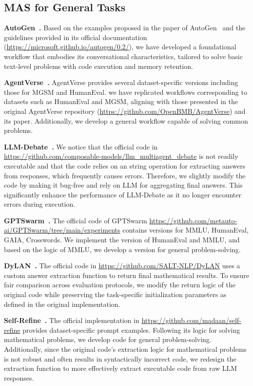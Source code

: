 \documentclass{article}
\begin{document}
\subsection{MAS for General Tasks}

\textbf{AutoGen~\cite{wu2024autogen}.}
Based on the examples proposed in the paper of AutoGen~\cite{wu2024autogen} and the guidelines provided in its official documentation (\url{https://microsoft.github.io/autogen/0.2/}), we have developed a foundational workflow that embodies its conversational characteristics, tailored to solve basic text-level problems with code execution and memory retention.

\textbf{AgentVerse~\cite{chen2023agentverse}.}
AgentVerse provides several dataset-specific versions including those for MGSM and HumanEval.
we have replicated workflows corresponding to datasets such as HumanEval and MGSM, aligning with those presented in the original AgentVerse repository (\url{https://github.com/OpenBMB/AgentVerse}) and its paper.
Additionally, we develop a general workflow capable of solving common problems.

\textbf{LLM-Debate~\cite{debate1}.}
We notice that the official code in \url{https://github.com/composable-models/llm_multiagent_debate} is not readily executable and that the code relies on an string operation for extracting answers from responses, which frequently causes errors.
Therefore, we slightly modify the code by making it bug-free and rely on LLM for aggregating final answers.
This significantly enhance the performance of LLM-Debate as it no longer encounter errors during execution.

\textbf{GPTSwarm~\cite{zhugegptswarm}.}  
The official code of GPTSwarm \url{https://github.com/metauto-ai/GPTSwarm/tree/main/experiments} contains versions for MMLU, HumanEval, GAIA, Crosswords. We implement the version of HumanEval and MMLU, and based on the logic of MMLU, we develop a version for general problem-solving.

\textbf{DyLAN~\cite{dylan}.}  
The official code in \url{https://github.com/SALT-NLP/DyLAN} uses a custom answer extraction function to return final mathematical results.
To ensure fair comparison across evaluation protocols, we modify the return logic of the original code while preserving the task-specific initialization parameters as defined in the original implementation.

\textbf{Self-Refine~\cite{Self-refine}.}  
The official implementation in \url{https://github.com/madaan/self-refine} provides dataset-specific prompt examples.
Following its logic for solving mathematical problems, we develop code for general problem-solving. Additionally, since the original code’s extraction logic for mathematical problems is not robust and often results in syntactically incorrect code, we redesign the extraction function to more effectively extract executable code from raw LLM responses.
\end{document}
